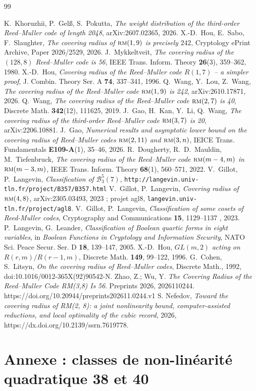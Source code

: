 \documentclass[11pt,a4paper]{article}
\def\bst(#1,#2,#3){\mathcal{B}_{#1}^{#2}(#3)}
\def\rmc(#1,#2){ \textsc {rm}(#1,#2) }
\theoremstyle{plain}
\theoremstyle{definition}
\theoremstyle{remark}
\begin{document}
\begin{thebibliography}{99}

 K.~Khoruzhii, P.~Gelß, S.~Pokutta, \emph{The weight distribution
 of the third-order Reed--Muller code of length 2048}, arXiv:2607.02365, 2026.
 X.-D.~Hou, E.~Sabo, F.~Slaughter, \emph{The covering radius of
 $\rmc(1,9)$ is precisely $242$}, Cryptology ePrint Archive, Paper 2026/2529, 2026.
 J.~Mykkeltveit, \emph{The covering radius of the $(128,8)$
 Reed--Muller code is 56}, IEEE Trans. Inform. Theory \textbf{26}(3), 359--362,
 1980. %
 X.-D.~Hou, \emph{Covering radius of the Reed--Muller code $R(1,7)$
 -- a simpler proof}, J. Combin. Theory Ser. A \textbf{74}, 337--341, 1996.
 Q.~Wang, Y.~Lou, Z.~Wang, \emph{The covering radius of the
 Reed--Muller code $\rmc(1,9)$ is 242}, arXiv:2610.17871, 2026.
 Q.~Wang, \emph{The covering radius of the Reed--Muller code $\rmc(2,7)$ is 40},
 Discrete Math. \textbf{342}(12), 111625, 2019.
 J.~Gao, H.~Kan, Y.~Li, Q.~Wang, \emph{The covering radius of the third-order
 Reed--Muller code $\rmc(3,7)$ is 20}, arXiv:2206.10881.
 J.~Gao, \emph{Numerical results and asymptotic lower bound on the covering
 radius of Reed--Muller codes $\rmc(2,11)$ and $\rmc(3,n)$}, IEICE Trans.
 Fundamentals \textbf{E109-A}(1), 35--46, 2026.
 R.~Dougherty, R.~D.~Mauldin, M.~Tiefenbruck, \emph{The covering radius of the
 Reed--Muller code $\rmc(m-4,m)$ in $\rmc(m-3,m)$}, IEEE Trans. Inform. Theory
 \textbf{68}(1), 560--571, 2022.
 V.~Gillot, P.~Langevin, \emph{Classification of $\bst(3,5,7)$},\newline
 \texttt{http://langevin.univ-tln.fr/project/B357/B357.html}
 V.~Gillot, P.~Langevin, \emph{Covering radius of $\rmc(4,8)$},
 arXiv:2305.03493, 2023 ; projet agl8, \texttt{langevin.univ-tln.fr/project/agl8}.
 V.~Gillot, P.~Langevin, \emph{Classification of some cosets of Reed-Muller codes},
	Cryptography and Communications  \textbf{15}, { 1129--1137 }, 2023.
 P.~Langevin, G.~Leander, \emph{Classification of Boolean quartic forms in eight
 variables}, in \emph{Boolean Functions in Cryptology and Information Security}, NATO Sci.
 Peace Secur. Ser. D \textbf{18}, 139--147, 2005.
 X.-D.~Hou, \emph{$GL(m,2)$ acting on $R(r,m)/R(r-1,m)$}, Discrete Math.
 \textbf{149}, 99--122, 1996.
 G.~Cohen, S.~Litsyn, \emph{On the covering radius of Reed--Muller codes},
 Discrete Math., 1992, doi:10.1016/0012-365X(92)90542-N.
 Zhao,  Z.; Wu,  Y. 
\emph{The Covering Radius of the Reed--Muller Code RM(3,8) Is 56}. 
Preprints 2026, 2026110244. https://doi.org/10.20944/preprints202611.0244.v1
S. Nefedov,
\emph{Toward the covering radius of RM(2, 8): a joint nonlinearity bound, computer-assisted reductions, and local optimality of the cubic record}, 
2026, https://dx.doi.org/10.2139/ssrn.7619778.
\end{thebibliography}

\appendix
\section{Annexe : classes de non-linéarité quadratique 38 et 40}\label{sec:annexe}


\end{document}

